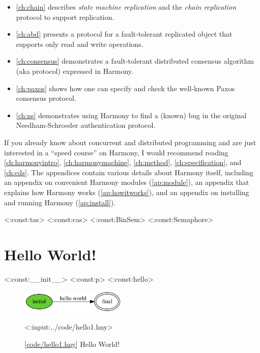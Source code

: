 \documentclass{report}
\newcommand{\harmonylink}[1]{%
[\href{https://harmony.cs.cornell.edu/#1}{\underline{#1}}]%
}
\newenvironment{code}{
\tcolorbox
}{
\endtcolorbox
}
\begin{document}
\begin{itemize}
\item \autoref{ch:chain} describes \emph{state machine replication} and
the \emph{chain replication} protocol to support replication.
\item \autoref{ch:abd} presents a protocol for a fault-tolerant
replicated object that supports only read and write operations.
\item \autoref{ch:consensus} demonstrates a fault-tolerant distributed consensus
algorithm (aka protocol) expressed in Harmony.
\item \autoref{ch:paxos} shows how one can specify and check the well-known
Paxos consensus protocol.
\item \autoref{ch:ns} demonstrates using Harmony to find a (known) bug in the original Needham-Schroeder authentication protocol.
\end{itemize}

If you already know about concurrent and distributed programming and
are just interested in a ``speed course'' on Harmony, I would recommend
reading \autoref{ch:harmonyintro}, \autoref{ch:harmonymachine},
\autoref{ch:method}, \autoref{ch:specification}, and \autoref{ch:cds}.
The appendices contain various details about Harmony itself, including
an appendix on convenient Harmony modules (\autoref{ap:module}),
an appendix that explains how Harmony works (\autoref{ap:howitworks}),
and
an appendix on installing and running Harmony (\autoref{ap:install}).

<{:const:tas}>
<{:const:cas}>
<{:const:BinSem}>
<{:const:Semaphore}>

\chapter{Hello World!}
\label{ch:harmonyintro}

<{:const:__init__}>
<{:const:p}>
<{:const:hello}>

\begin{figure}
\begin{center}
\includegraphics[width=0.45\textwidth]{figures/hello1.png}
\end{center}
\begin{code}
<{:input:../code/hello1.hny}>
\end{code}
\caption{\harmonylink{code/hello1.hny} Hello World!}
\label{fig:helloworld}
\end{figure}
\end{document}
